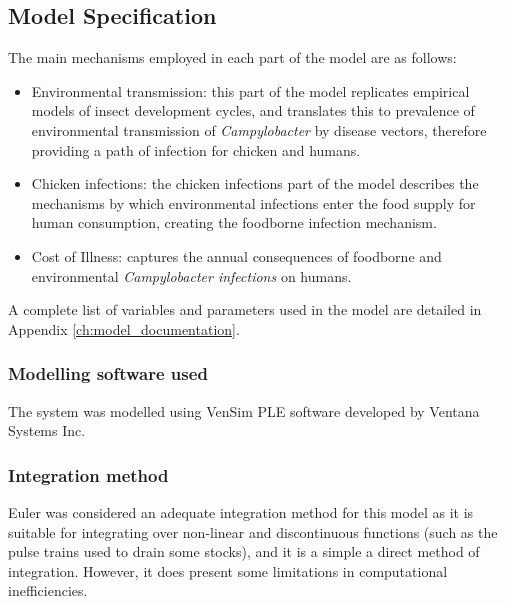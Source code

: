 \subsection{Model Specification}
The main mechanisms employed in each part of the model are as follows:
\begin{itemize}
    \item Environmental transmission: this part of the model replicates empirical models of insect development cycles, and translates this to prevalence of environmental transmission of \textit{Campylobacter} by disease vectors, therefore providing a path of infection for chicken and humans.
    \item Chicken infections: the chicken infections part of the model describes the mechanisms by which environmental infections enter the food supply for human consumption, creating the foodborne infection mechanism.
    \item Cost of Illness: captures the annual consequences of foodborne and environmental \textit{Campylobacter infections} on humans. %
    
\end{itemize} %

A complete list of variables and parameters used in the model are detailed in Appendix \ref{ch:model_documentation}.

\subsubsection{Modelling software used}
The system was modelled using VenSim PLE software developed by Ventana Systems Inc.
    
\subsubsection{Integration method}
Euler was considered an adequate integration method for this model as it is suitable for integrating over non-linear and discontinuous functions (such as the pulse trains used to drain some stocks), and it is a simple a direct method of integration. However, it does present some limitations in computational inefficiencies.

